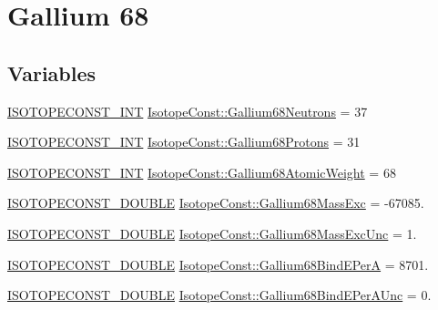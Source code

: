 \hypertarget{group___isotope_const-_gallium-_ga68}{}\section{Gallium 68}
\label{group___isotope_const-_gallium-_ga68}
\subsection*{Variables}
\begin{DoxyCompactItemize}
\item 
\mbox{\hyperlink{group___isotope_const-_macros_ga5f18360b3e99483a35c32d789e62621c}{I\+S\+O\+T\+O\+P\+E\+C\+O\+N\+S\+T\+\_\+\+I\+NT}} \mbox{\hyperlink{group___isotope_const-_gallium-_ga68_ga52c20649410d578b6004e890aedbca14}{Isotope\+Const\+::\+Gallium68\+Neutrons}} = 37
\item 
\mbox{\hyperlink{group___isotope_const-_macros_ga5f18360b3e99483a35c32d789e62621c}{I\+S\+O\+T\+O\+P\+E\+C\+O\+N\+S\+T\+\_\+\+I\+NT}} \mbox{\hyperlink{group___isotope_const-_gallium-_ga68_gabe130051a23c072399e3946fc10ad133}{Isotope\+Const\+::\+Gallium68\+Protons}} = 31
\item 
\mbox{\hyperlink{group___isotope_const-_macros_ga5f18360b3e99483a35c32d789e62621c}{I\+S\+O\+T\+O\+P\+E\+C\+O\+N\+S\+T\+\_\+\+I\+NT}} \mbox{\hyperlink{group___isotope_const-_gallium-_ga68_ga995aa2aeb1ea8ac89371cfdd6b2c2380}{Isotope\+Const\+::\+Gallium68\+Atomic\+Weight}} = 68
\item 
\mbox{\hyperlink{group___isotope_const-_macros_ga8f45a7272ce02c0b4c65c44636ed719a}{I\+S\+O\+T\+O\+P\+E\+C\+O\+N\+S\+T\+\_\+\+D\+O\+U\+B\+LE}} \mbox{\hyperlink{group___isotope_const-_gallium-_ga68_ga710a2261d3479412b2ad376d69c3e24c}{Isotope\+Const\+::\+Gallium68\+Mass\+Exc}} = -\/67085.
\item 
\mbox{\hyperlink{group___isotope_const-_macros_ga8f45a7272ce02c0b4c65c44636ed719a}{I\+S\+O\+T\+O\+P\+E\+C\+O\+N\+S\+T\+\_\+\+D\+O\+U\+B\+LE}} \mbox{\hyperlink{group___isotope_const-_gallium-_ga68_gae1770ec55310c945aefd56491924cd6d}{Isotope\+Const\+::\+Gallium68\+Mass\+Exc\+Unc}} = 1.
\item 
\mbox{\hyperlink{group___isotope_const-_macros_ga8f45a7272ce02c0b4c65c44636ed719a}{I\+S\+O\+T\+O\+P\+E\+C\+O\+N\+S\+T\+\_\+\+D\+O\+U\+B\+LE}} \mbox{\hyperlink{group___isotope_const-_gallium-_ga68_ga37334016283baba10c2540b935dda499}{Isotope\+Const\+::\+Gallium68\+Bind\+E\+PerA}} = 8701.
\item 
\mbox{\hyperlink{group___isotope_const-_macros_ga8f45a7272ce02c0b4c65c44636ed719a}{I\+S\+O\+T\+O\+P\+E\+C\+O\+N\+S\+T\+\_\+\+D\+O\+U\+B\+LE}} \mbox{\hyperlink{group___isotope_const-_gallium-_ga68_gad4f863a6a96e825296fb8f3e9fd26577}{Isotope\+Const\+::\+Gallium68\+Bind\+E\+Per\+A\+Unc}} = 0.

\end{DoxyCompactItemize}
